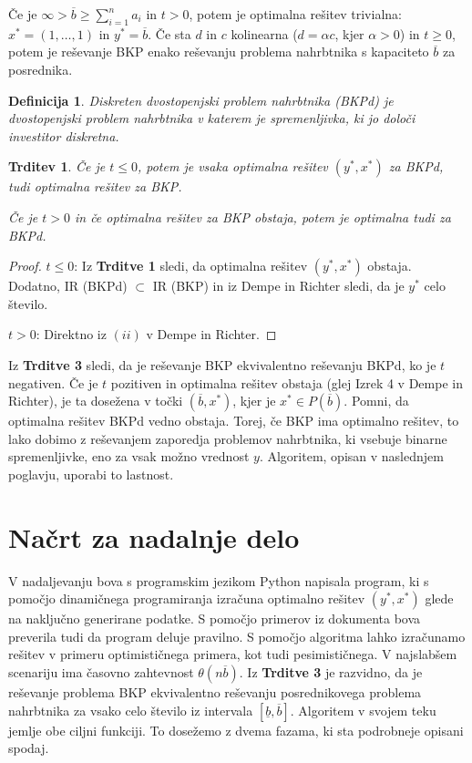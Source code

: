 \documentclass[a4paper, 11pt]{article}
\newtheorem{theorem}{Trditev}
\newtheorem{definition}{Definicija}
\begin{document}
	Če je $\infty > \overline{b} \geq \sum_{i=1}^na_i$ in $t > 0$, potem je optimalna rešitev trivialna: $x^* = (1, \dots, 1)$ in $y^* = \overline{b}$. Če sta $d$ in $c$ kolinearna ($d = \alpha c$, kjer $\alpha > 0$) in $t \geq 0$, potem je reševanje BKP enako reševanju problema nahrbtnika s kapaciteto $\overline{b}$ za posrednika.
	
	\begin{definition}
	Diskreten dvostopenjski problem nahrbtnika (BKPd) je dvostopenjski problem nahrbtnika v katerem je spremenljivka, ki jo določi investitor diskretna.
	\end{definition}

	\begin{theorem}
	Če je $t \leq 0$, potem je vsaka optimalna rešitev $(y^*, x^*)$ za BKPd, tudi optimalna rešitev za BKP.
	
	Če je $t > 0$ in če optimalna rešitev za BKP obstaja, potem je optimalna tudi za BKPd.	
	\end{theorem}
	
	\begin{proof}
	$t \leq 0$: Iz \textbf{Trditve 1} sledi, da optimalna rešitev $(y^*, x^*)$ obstaja. Dodatno, IR (BKPd) $\subset$ IR (BKP) in iz Dempe in Richter sledi, da je $y^*$ celo število.
	
	$t > 0$: Direktno iz $(ii)$ v Dempe in Richter.
	\end{proof}

	Iz \textbf{Trditve 3} sledi, da je reševanje BKP ekvivalentno reševanju BKPd, ko je $t$ negativen. Če je $t$ pozitiven in optimalna rešitev obstaja (glej Izrek 4 v Dempe in Richter), je ta dosežena v točki $(\overline{b}, x^*)$, kjer je $x^* \in P(\overline{b})$. Pomni, da optimalna rešitev BKPd vedno obstaja. Torej, če BKP ima optimalno rešitev, to lako dobimo z reševanjem zaporedja problemov nahrbtnika, ki vsebuje binarne spremenljivke, eno za vsak možno vrednost $y$. Algoritem, opisan v naslednjem poglavju, uporabi to lastnost.
	\section{Načrt za nadalnje delo}
	V nadaljevanju bova s programskim jezikom Python napisala program, ki s pomočjo dinamičnega programiranja izračuna optimalno rešitev $(y^*, x^*)$ glede na naključno generirane podatke. S pomočjo primerov iz dokumenta bova preverila tudi da program deluje pravilno. S pomočjo algoritma lahko izračunamo rešitev v primeru optimističnega primera, kot tudi pesimističnega. V najslabšem scenariju ima časovno zahtevnost $\theta(n\overline{b})$. Iz \textbf{Trditve 3} je razvidno, da je reševanje problema BKP ekvivalentno reševanju posrednikovega problema nahrbtnika za vsako celo število iz intervala $[ \underline{b}, \overline{b}]$. Algoritem v svojem teku jemlje obe ciljni funkciji. To dosežemo z dvema fazama, ki sta podrobneje opisani spodaj. \\
\end{document}
